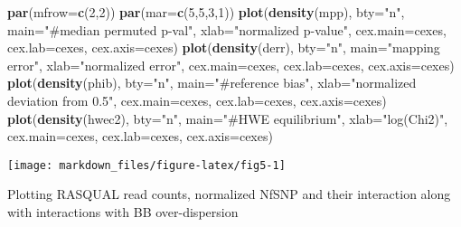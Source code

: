 \documentclass[]{article}
\newenvironment{Shaded}{\begin{snugshade}}{\end{snugshade}}
\newcommand{\KeywordTok}[1]{\textcolor[rgb]{0.13,0.29,0.53}{\textbf{#1}}}
\newcommand{\DataTypeTok}[1]{\textcolor[rgb]{0.13,0.29,0.53}{#1}}
\newcommand{\DecValTok}[1]{\textcolor[rgb]{0.00,0.00,0.81}{#1}}
\newcommand{\StringTok}[1]{\textcolor[rgb]{0.31,0.60,0.02}{#1}}
\newcommand{\NormalTok}[1]{#1}
\begin{document}
\begin{Shaded}
\begin{Highlighting}[]
\KeywordTok{par}\NormalTok{(}\DataTypeTok{mfrow=}\KeywordTok{c}\NormalTok{(}\DecValTok{2}\NormalTok{,}\DecValTok{2}\NormalTok{))}
\KeywordTok{par}\NormalTok{(}\DataTypeTok{mar=}\KeywordTok{c}\NormalTok{(}\DecValTok{5}\NormalTok{,}\DecValTok{5}\NormalTok{,}\DecValTok{3}\NormalTok{,}\DecValTok{1}\NormalTok{))}
\KeywordTok{plot}\NormalTok{(}\KeywordTok{density}\NormalTok{(mpp), }\DataTypeTok{bty=}\StringTok{"n"}\NormalTok{, }\DataTypeTok{main=}\StringTok{"#median permuted p-val"}\NormalTok{, }
     \DataTypeTok{xlab=}\StringTok{"normalized p-value"}\NormalTok{, }\DataTypeTok{cex.main=}\NormalTok{cexes, }\DataTypeTok{cex.lab=}\NormalTok{cexes, }\DataTypeTok{cex.axis=}\NormalTok{cexes)}
\KeywordTok{plot}\NormalTok{(}\KeywordTok{density}\NormalTok{(derr), }\DataTypeTok{bty=}\StringTok{"n"}\NormalTok{, }\DataTypeTok{main=}\StringTok{"mapping error"}\NormalTok{, }
     \DataTypeTok{xlab=}\StringTok{"normalized error"}\NormalTok{, }\DataTypeTok{cex.main=}\NormalTok{cexes, }\DataTypeTok{cex.lab=}\NormalTok{cexes, }\DataTypeTok{cex.axis=}\NormalTok{cexes)}
\KeywordTok{plot}\NormalTok{(}\KeywordTok{density}\NormalTok{(phib), }\DataTypeTok{bty=}\StringTok{"n"}\NormalTok{, }\DataTypeTok{main=}\StringTok{"#reference bias"}\NormalTok{, }
     \DataTypeTok{xlab=}\StringTok{"normalized deviation from 0.5"}\NormalTok{, }\DataTypeTok{cex.main=}\NormalTok{cexes, }\DataTypeTok{cex.lab=}\NormalTok{cexes, }\DataTypeTok{cex.axis=}\NormalTok{cexes)}
\KeywordTok{plot}\NormalTok{(}\KeywordTok{density}\NormalTok{(hwec2), }\DataTypeTok{bty=}\StringTok{"n"}\NormalTok{, }\DataTypeTok{main=}\StringTok{"#HWE equilibrium"}\NormalTok{, }
     \DataTypeTok{xlab=}\StringTok{"log(Chi2)"}\NormalTok{, }\DataTypeTok{cex.main=}\NormalTok{cexes, }\DataTypeTok{cex.lab=}\NormalTok{cexes, }\DataTypeTok{cex.axis=}\NormalTok{cexes)}
\end{Highlighting}
\end{Shaded}

\begin{center}\texttt{[image: markdown\_files/figure-latex/fig5-1]} \end{center}

Plotting RASQUAL read counts, normalized NfSNP and their interaction
along with interactions with BB over-dispersion
\end{document}
